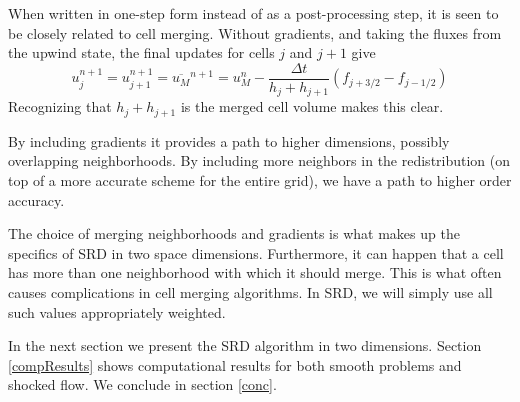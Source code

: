 When written in one-step form instead of as a post-processing step, 
it is seen to be closely related to cell merging. 
Without gradients, and taking the fluxes from the upwind state, the 
final updates for cells $j$ and $j+1$ give
\begin{equation}
u_j^{n+1} = u_{j+1}^{n+1} = \overline{u_M}^{n+1} = u_M^n - 
\frac{\Delta t}{h_j + h_{j+1}} (f_{j+3/2} - f_{j-1/2})
\end{equation}
Recognizing that $h_j+h_{j+1}$ is the merged cell volume makes this
clear.

By including gradients it provides a path to higher dimensions, possibly 
overlapping neighborhoods. By including more neighbors in the
redistribution (on top of a more accurate scheme for the entire grid),
we have a path to higher order accuracy.

The choice of merging neighborhoods and gradients is what makes up the
specifics of SRD in two space dimensions. Furthermore, it can happen
that a cell has more than one neighborhood with
which it should merge. This is what often causes complications in cell
merging algorithms. In SRD, we will simply use all such values appropriately
weighted.

In the next section we present the SRD algorithm in two dimensions.
Section \ref{compResults} shows computational results for both smooth
problems and shocked flow.  We conclude in section \ref{conc}.
